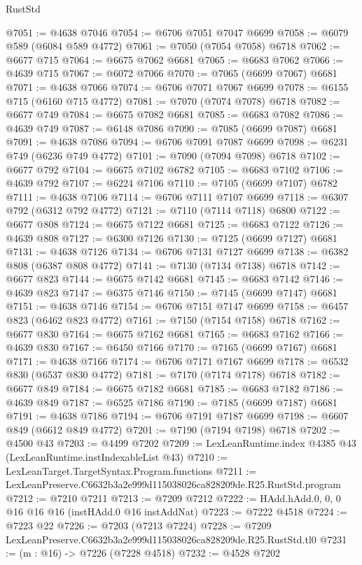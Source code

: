\begin{lexlean}{RustStd}
\begin{coremodule}
@7051 := @4638 @7046
@7054 := @6706 @7051 @7047 @6699
@7058 := @6079 @589 (@6084 @589 @4772)
@7061 := @7050 (@7054 @7058) @6718
@7062 := @6677 @715
@7064 := @6675 @7062 @6681
@7065 := @6683 @7062
@7066 := @4639 @715
@7067 := @6072 @7066
@7070 := @7065 (@6699 @7067) @6681
@7071 := @4638 @7066
@7074 := @6706 @7071 @7067 @6699
@7078 := @6155 @715 (@6160 @715 @4772)
@7081 := @7070 (@7074 @7078) @6718
@7082 := @6677 @749
@7084 := @6675 @7082 @6681
@7085 := @6683 @7082
@7086 := @4639 @749
@7087 := @6148 @7086
@7090 := @7085 (@6699 @7087) @6681
@7091 := @4638 @7086
@7094 := @6706 @7091 @7087 @6699
@7098 := @6231 @749 (@6236 @749 @4772)
@7101 := @7090 (@7094 @7098) @6718
@7102 := @6677 @792
@7104 := @6675 @7102 @6782
@7105 := @6683 @7102
@7106 := @4639 @792
@7107 := @6224 @7106
@7110 := @7105 (@6699 @7107) @6782
@7111 := @4638 @7106
@7114 := @6706 @7111 @7107 @6699
@7118 := @6307 @792 (@6312 @792 @4772)
@7121 := @7110 (@7114 @7118) @6800
@7122 := @6677 @808
@7124 := @6675 @7122 @6681
@7125 := @6683 @7122
@7126 := @4639 @808
@7127 := @6300 @7126
@7130 := @7125 (@6699 @7127) @6681
@7131 := @4638 @7126
@7134 := @6706 @7131 @7127 @6699
@7138 := @6382 @808 (@6387 @808 @4772)
@7141 := @7130 (@7134 @7138) @6718
@7142 := @6677 @823
@7144 := @6675 @7142 @6681
@7145 := @6683 @7142
@7146 := @4639 @823
@7147 := @6375 @7146
@7150 := @7145 (@6699 @7147) @6681
@7151 := @4638 @7146
@7154 := @6706 @7151 @7147 @6699
@7158 := @6457 @823 (@6462 @823 @4772)
@7161 := @7150 (@7154 @7158) @6718
@7162 := @6677 @830
@7164 := @6675 @7162 @6681
@7165 := @6683 @7162
@7166 := @4639 @830
@7167 := @6450 @7166
@7170 := @7165 (@6699 @7167) @6681
@7171 := @4638 @7166
@7174 := @6706 @7171 @7167 @6699
@7178 := @6532 @830 (@6537 @830 @4772)
@7181 := @7170 (@7174 @7178) @6718
@7182 := @6677 @849
@7184 := @6675 @7182 @6681
@7185 := @6683 @7182
@7186 := @4639 @849
@7187 := @6525 @7186
@7190 := @7185 (@6699 @7187) @6681
@7191 := @4638 @7186
@7194 := @6706 @7191 @7187 @6699
@7198 := @6607 @849 (@6612 @849 @4772)
@7201 := @7190 (@7194 @7198) @6718
@7202 := @4500 @43
@7203 := @4499 @7202
@7209 := LexLeanRuntime.index @4385 @43 (LexLeanRuntime.instIndexableList @43)
@7210 := LexLeanTarget.TargetSyntax.Program.functions
@7211 := LexLeanPreserve.C6632b3a2e999d115038026ca828209de.R25.RustStd.program
@7212 := @7210 @7211
@7213 := @7209 @7212
@7222 := HAdd.hAdd.{0, 0, 0} @16 @16 @16 (instHAdd.{0} @16 instAddNat)
@7223 := @7222 @4518
@7224 := @7223 @22
@7226 := @7203 (@7213 @7224)
@7228 := @7209 LexLeanPreserve.C6632b3a2e999d115038026ca828209de.R25.RustStd.tl0
@7231 := (m : @16) -> @7226 (@7228 @4518)
@7232 := @4528 @7202

\end{coremodule}
\end{lexlean}
